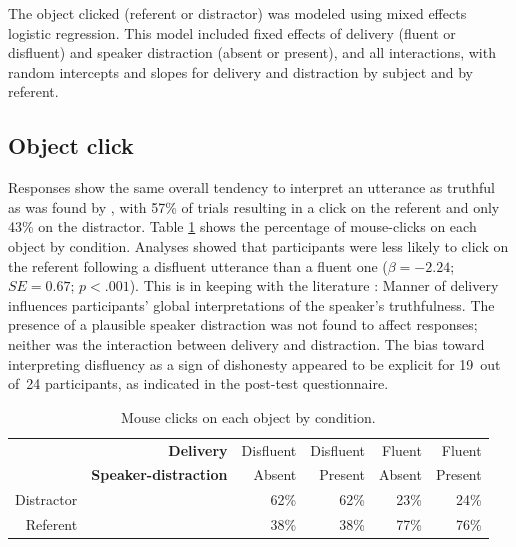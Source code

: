 \documentclass[a4paper,man,natbib]{apa6}
\newcommand*{\SE}{\mathit{SE}} %
\begin{document}
The object clicked (referent or distractor) was modeled using mixed effects logistic regression.
This model included  fixed effects of delivery (fluent or disfluent) and speaker distraction (absent or present), and all interactions, with random intercepts and slopes for delivery and distraction by subject and by referent.

\subsection{Object click}
Responses show the same overall tendency to interpret an utterance as truthful as was found by \citet{Loy2016}, with 57\% of trials resulting in a click on the referent and only 43\% on the distractor.
Table \ref{table:objctclck} shows the percentage of mouse-clicks on each object by condition.
Analyses showed that participants were less likely to click on the referent following a disfluent utterance than a fluent one ($\beta = -2.24$; $\SE = 0.67$; $p<.001$). 
This is in keeping with the literature \citep{depaulo2003cues,Zuckerman1981}:
Manner of delivery influences participants' global interpretations of the speaker's truthfulness. 
The presence of a plausible speaker distraction was not found to affect responses; neither was the interaction between delivery and distraction. 
The bias toward interpreting disfluency as a sign of dishonesty appeared to be explicit for 19~out of~24 participants, as indicated in the post-test questionnaire. 



\begin{table}[ht]
\centering
\begin{tabular}{rrrrrr}
  \hline
& \textbf{Delivery} & Disfluent & Disfluent & Fluent & Fluent \\ 
& \textbf{Speaker-distraction} & Absent & Present & Absent & Present \\
  \hline
Distractor & &  62\% &  62\% &  23\% &  24\% \\ 
  Referent & &  38\% &  38\% &  77\% &  76\% \\ 
   \hline
\end{tabular}
\caption{Mouse clicks on each object by condition.}
\label{table:objctclck}
\end{table}

\end{document}
